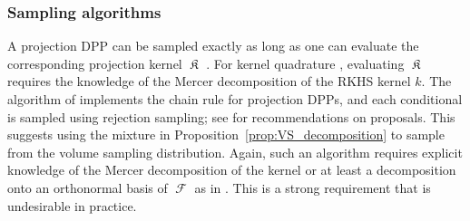 \documentclass[twoside,11pt]{book}
\numberwithin{theorem}{chapter}
\numberwithin{definition}{chapter}
\numberwithin{proposition}{chapter}
\numberwithin{corollary}{chapter}
\numberwithin{example}{chapter}
\numberwithin{lemma}{chapter}
\DeclareMathOperator*{\KDPP}{\mathfrak{K}}
\DeclareMathOperator{\F}{\mathcal{F}}
\begin{document}
\subsubsection{Sampling algorithms}


A projection DPP can be sampled exactly as long as one can evaluate the corresponding projection kernel $\KDPP$ \citep{HoKrPeVi06}. For kernel quadrature \citep{BeBaCh19}, evaluating $\KDPP$ requires the knowledge of the Mercer decomposition of the RKHS kernel $k$. The algorithm of \cite{HoKrPeVi06} implements the chain rule for projection DPPs, and each conditional is sampled using rejection sampling; see \cite{GaBaVa19} for recommendations on proposals. This suggests using the mixture in Proposition~\ref{prop:VS_decomposition} to sample from the volume sampling distribution.
Again, such an algorithm requires explicit knowledge of the Mercer decomposition of the kernel or at least a decomposition onto an orthonormal basis of $\F$ as in \citep{KaSaTa19}. This is a strong requirement that is undesirable in practice.
\end{document}
